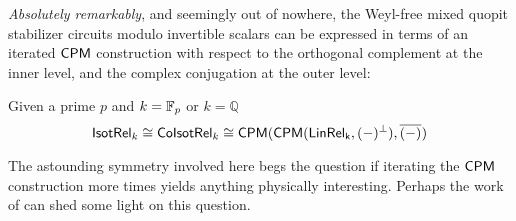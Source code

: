 






{\em Absolutely remarkably}, and seemingly out of nowhere, the Weyl-free mixed quopit stabilizer circuits modulo invertible scalars can be expressed in terms of an iterated $\mathsf{CPM}$ construction with respect to the orthogonal complement at the inner level, and the complex conjugation at the outer level:
\begin{corollary}
Given a prime $p$ and $k=\mathbb{F}_p$ or $k=\mathbb{Q}$
$${\sf Isot}\mathsf{Rel}_{k}\cong{\sf Co}{\sf Isot}\mathsf{Rel}_{k}\cong \mathsf{CPM}(\mathsf{CPM}(\sf LinRel_{k},(-)^\perp),\overline{(-)}\hspace*{.01cm})$$
\end{corollary}
The astounding symmetry involved here begs the question if iterating the $\mathsf{CPM}$ construction more times yields anything physically interesting. Perhaps the work of \cite{CPMho} can shed some light on this question. 

